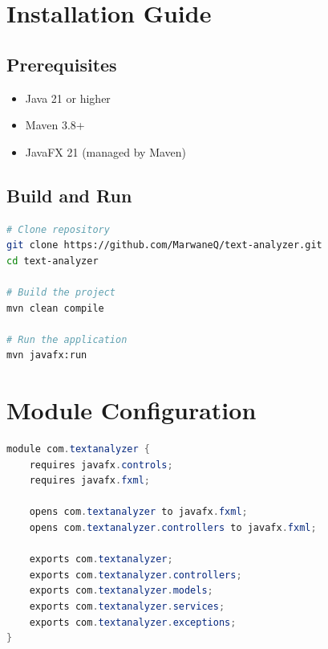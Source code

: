 \documentclass[12pt,a4paper]{report}
\begin{document}
\chapter{Installation Guide}

\section{Prerequisites}
\begin{itemize}
    \item Java 21 or higher
    \item Maven 3.8+
    \item JavaFX 21 (managed by Maven)
\end{itemize}

\section{Build and Run}
\begin{lstlisting}[language=bash]
# Clone repository
git clone https://github.com/MarwaneQ/text-analyzer.git
cd text-analyzer

# Build the project
mvn clean compile

# Run the application
mvn javafx:run
\end{lstlisting}

\chapter{Module Configuration}
\begin{lstlisting}[language=Java, caption=module-info.java]
module com.textanalyzer {
    requires javafx.controls;
    requires javafx.fxml;

    opens com.textanalyzer to javafx.fxml;
    opens com.textanalyzer.controllers to javafx.fxml;

    exports com.textanalyzer;
    exports com.textanalyzer.controllers;
    exports com.textanalyzer.models;
    exports com.textanalyzer.services;
    exports com.textanalyzer.exceptions;
}
\end{lstlisting}
\end{document}
